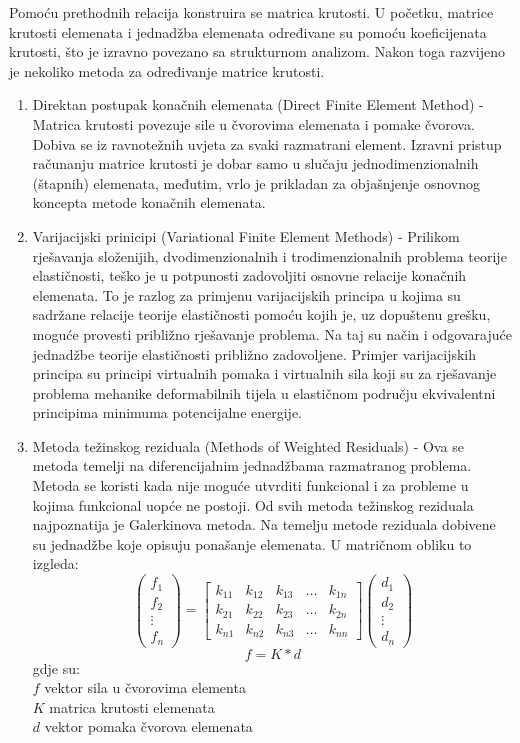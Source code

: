 \documentclass[a4paper,twoside,12pt]{memoir} %
\begin{document}
Pomoću prethodnih relacija konstruira se matrica krutosti. U početku, matrice krutosti elemenata i jednadžba elemenata određivane su pomoću koeficijenata krutosti, što je izravno povezano sa strukturnom analizom. Nakon toga razvijeno je nekoliko metoda za određivanje matrice krutosti.
\begin{enumerate}
    \item Direktan postupak konačnih elemenata (Direct Finite Element Method) -
    Matrica krutosti povezuje sile u čvorovima elemenata i pomake čvorova. Dobiva se iz ravnotežnih uvjeta za svaki razmatrani element. Izravni pristup računanju matrice krutosti je dobar samo u slučaju jednodimenzionalnih (štapnih) elemenata, međutim, vrlo je prikladan za objašnjenje osnovnog koncepta metode konačnih elemenata.
    
    \item Varijacijski prinicipi (Variational Finite Element Methods) -
    Prilikom rješavanja složenijih, dvodimenzionalnih i trodimenzionalnih problema teorije elastičnosti, teško je u potpunosti zadovoljiti osnovne relacije konačnih elemenata. To je razlog za primjenu varijacijskih principa u kojima su sadržane relacije teorije elastičnosti pomoću kojih je, uz dopuštenu grešku, moguće provesti približno rješavanje problema. Na taj su način i odgovarajuće jednadžbe teorije elastičnosti približno zadovoljene. Primjer varijacijskih principa su principi virtualnih pomaka i virtualnih sila koji su za rješavanje problema mehanike deformabilnih tijela u elastičnom području ekvivalentni principima minimuma potencijalne energije.
    
    \item Metoda težinskog reziduala (Methods of Weighted Residuals) -
    Ova se metoda temelji na diferencijalnim jednadžbama razmatranog problema. Metoda se koristi kada nije moguće utvrditi funkcional i za probleme u kojima funkcional uopće ne postoji. Od svih metoda težinskog reziduala najpoznatija je Galerkinova metoda. Na temelju metode reziduala dobivene su jednadžbe koje opisuju ponašanje elemenata. U matričnom obliku to izgleda:
    $$
    \begin{pmatrix} f_1 \\ f_2 \\ \vdots \\ f_n \end{pmatrix}
    =
    \begin{bmatrix}
    k_{11}       & k_{12} & k_{13} & \dots & k_{1n} \\
    k_{21}       & k_{22} & k_{23} & \dots & k_{2n} \\
    k_{n1}       & k_{n2} & k_{n3} & \dots & k_{nn}
    \end{bmatrix} 
    \begin{pmatrix} d_1 \\ d_2 \\ \vdots \\ d_n \end{pmatrix}
    $$
    $$ f = K * d $$
    gdje su: \\
    $f$ vektor sila u čvorovima elementa \\
    $K$ matrica krutosti elemenata \\
    $d$ vektor pomaka čvorova elemenata 
\end{enumerate}
\end{document}
